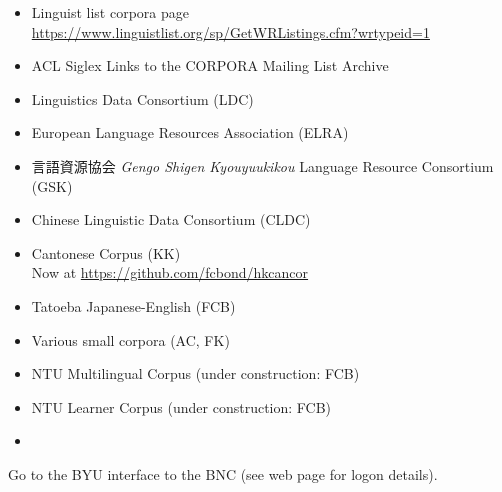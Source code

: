 \documentclass[a4paper,landscape,headrule,footrule,xetex]{foils}
\begin{document}

\begin{itemize}
\item Linguist list corpora page
\\ \url{https://www.linguistlist.org/sp/GetWRListings.cfm?wrtypeid=1}
\item ACL Siglex Links to the CORPORA Mailing List Archive
\item Linguistics Data Consortium (LDC)
\item European Language Resources Association (ELRA)
\item 言語資源協会 \textit{Gengo Shigen Kyouyuukikou} Language Resource Consortium (GSK)
\item {} Chinese Linguistic Data Consortium (CLDC)
\end{itemize}


\begin{itemize}
\item Cantonese Corpus (KK)
\\ Now at \href{https://github.com/fcbond/hkcancor}{https://github.com/fcbond/hkcancor}
\item Tatoeba Japanese-English (FCB)
\item Various small corpora (AC, FK)
\item NTU Multilingual Corpus (under construction: FCB)
\item NTU Learner Corpus (under construction: FCB)
\item {}
\end{itemize}


Go to the BYU interface to the BNC (see web page for logon details).
\end{document}
